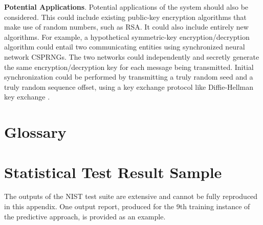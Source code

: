 \documentclass[12pt, titlepage]{report}
\theoremstyle{definition}
\begin{document}
\textbf{Potential Applications}. Potential applications of the system should also be considered. This could include existing public-key encryption algorithms that make use of random numbers, such as RSA. It could also include entirely new algorithms. For example, a hypothetical symmetric-key encryption/decryption algorithm could entail two communicating entities using synchronized neural network CSPRNGs. The two networks could independently and secretly generate the same encryption/decryption key for each message being transmitted. Initial synchronization could be performed by transmitting a truly random seed and a truly random sequence offset, using a key exchange protocol like Diffie-Hellman key exchange \cite[p. 174-177]{anderson2010security}.










\appendix
\chapter{Glossary}



\chapter{Statistical Test Result Sample}\label{appendix:sample}
The outputs of the NIST test suite are extensive and cannot be fully reproduced in this appendix. One output report, produced for the 9th training instance of the predictive approach, is provided as an example.
\end{document}
